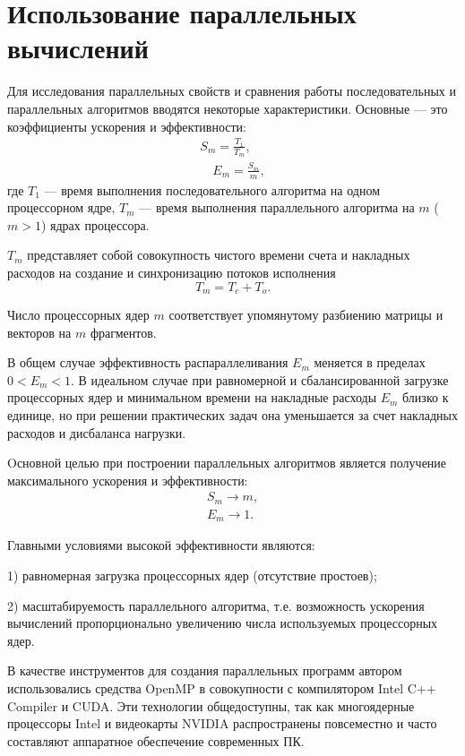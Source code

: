 \newpage
\section{Использование параллельных вычислений}
Для исследования параллельных свойств и сравнения работы последовательных и параллельных алгоритмов вводятся некоторые характеристики. Основные --- это коэффициенты ускорения и эффективности:
\begin{equation}\nonumber
\begin{aligned}
S_m=\frac{T_1}{T_m},\\[16pt]
\quad E_m=\frac{S_m}{m},
\end{aligned}
\end{equation}
где 
$T_1$ --- время выполнения последовательного алгоритма на одном
процессорном ядре,
$T_m$ --- время выполнения параллельного алгоритма на $m$ ($m>1$) ядрах процессора.

$T_m$ представляет собой совокупность чистого времени счета 
и накладных расходов на создание и синхронизацию потоков исполнения $$T_m=T_c+T_o.$$

Число процессорных ядер $m$ соответствует упомянутому разбиению матрицы и векторов на $m$ фрагментов.

В общем случае эффективность распараллеливания $E_m$ меняется в пределах $0<E_m<1$. В идеальном случае при равномерной и сбалансированной загрузке процессорных ядер и минимальном времени на накладные расходы $E_m$ близко к единице, но при решении практических задач  она уменьшается за счет накладных расходов и дисбаланса нагрузки.

Oсновной целью при построении параллельных алгоритмов является получение максимального ускорения и эффективности:
\begin{equation}\nonumber
\begin{aligned}
S_m \rightarrow m, \\[16pt]
E_m \rightarrow 1.
\end{aligned}
\end{equation}

Главными условиями высокой эффективности являются:

1) равномерная загрузка процессорных ядер (отсутствие простоев);

2) масштабируемость параллельного алгоритма, т.е. возможность ускорения вычислений
пропорционально увеличению числа используемых процессорных ядер.

В качестве инструментов для создания параллельных программ автором использовались средства OpenMP в совокупности с компилятором Intel C++ Compiler и CUDA. Эти технологии общедоступны, так как многоядерные процессоры Intel и видеокарты NVIDIA распространены повсеместно и часто составляют аппаратное обеспечение современных ПК. 

